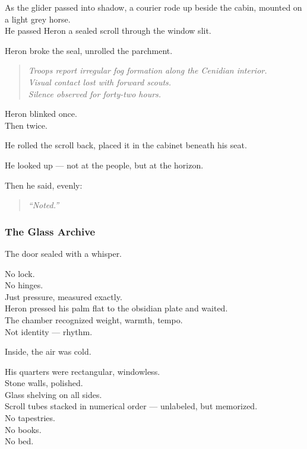 \documentclass[12pt]{article}
\begin{document}
\vspace{1em}

As the glider passed into shadow, a courier rode up beside the cabin, mounted on a light grey horse.\\
He passed Heron a sealed scroll through the window slit.

Heron broke the seal, unrolled the parchment.

\begin{quote}
\textit{Troops report irregular fog formation along the Cenidian interior.\\
Visual contact lost with forward scouts.\\
Silence observed for forty-two hours.}
\end{quote}

Heron blinked once.\\
Then twice.

He rolled the scroll back, placed it in the cabinet beneath his seat.

He looked up — not at the people, but at the horizon.

Then he said, evenly:

\begin{quote}
\textit{“Noted.”}
\end{quote}

\dotfill

\subsubsection*{The Glass Archive}

The door sealed with a whisper.

No lock.\\
No hinges.\\
Just pressure, measured exactly.\\
Heron pressed his palm flat to the obsidian plate and waited.\\
The chamber recognized weight, warmth, tempo.\\
Not identity — rhythm.

Inside, the air was cold.

\vspace{1em}

His quarters were rectangular, windowless.\\
Stone walls, polished.\\
Glass shelving on all sides.\\
Scroll tubes stacked in numerical order — unlabeled, but memorized.\\
No tapestries.\\
No books.\\
No bed.
\end{document}
